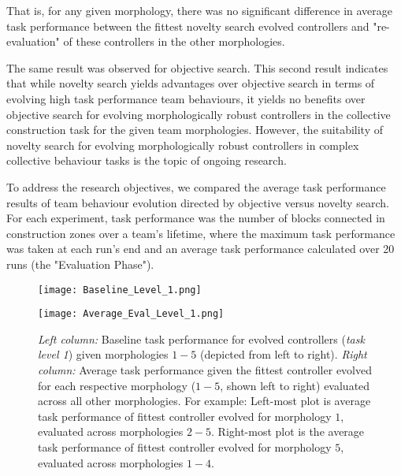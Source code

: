 That is, for any given morphology, there was no significant difference in average task performance between the fittest novelty search evolved controllers and "re-evaluation" of these controllers in the other morphologies. 

The same result was observed for objective search.
This second result indicates that while novelty search yields advantages over objective search in terms of evolving high task performance team behaviours, it yields no benefits over objective search for evolving morphologically robust controllers in the collective construction task for the given team morphologies.
However, the suitability of novelty search for evolving morphologically robust controllers in complex collective behaviour tasks is the topic of ongoing research.






To address the research objectives, we compared the average task performance results of team behaviour evolution directed by objective versus novelty search. 
For each experiment, task performance was the number of blocks connected in construction zones over a team's lifetime, where the maximum task performance was taken at each run's end and an average task performance calculated over 20 runs (the "Evaluation Phase").










\begin{figure*}[t]
	\begin{minipage}{0.5\textwidth}
		\texttt{[image: Baseline\_Level\_1.png]}
	\end{minipage}
	\begin{minipage}{0.5\textwidth}
		\texttt{[image: Average\_Eval\_Level\_1.png]}
	\end{minipage}
\caption{\textit{Left column:} Baseline task performance for evolved controllers (\textit{task level 1})
given morphologies $1-5$ (depicted from left to right).
\textit{Right column:} Average task performance given the fittest controller evolved
for each respective morphology ($1-5$, shown left to right) evaluated across all other morphologies.
For example: Left-most plot is average task performance of fittest controller evolved for
morphology $1$, evaluated across morphologies $2-5$.  Right-most plot is the average task performance
of fittest controller evolved for morphology $5$, evaluated across morphologies $1-4$.}\label{fig:level1results}
\end{figure*}

